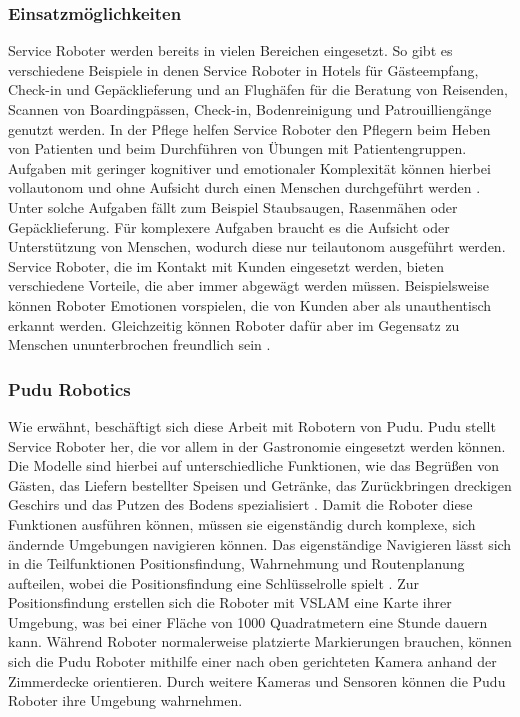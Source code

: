 \subsubsection{Einsatzmöglichkeiten}
Service Roboter werden bereits in vielen Bereichen eingesetzt. So gibt es verschiedene Beispiele in denen Service Roboter in Hotels für Gästeempfang, Check-in und Gepäcklieferung und an Flughäfen für die Beratung von Reisenden, Scannen von Boardingpässen, Check-in, Bodenreinigung und Patrouilliengänge genutzt werden. In der Pflege helfen Service Roboter den Pflegern beim Heben von Patienten und beim Durchführen von Übungen mit Patientengruppen.\cite[S.~425-427]{Paluch2020} Aufgaben mit geringer kognitiver und emotionaler Komplexität können hierbei vollautonom und ohne Aufsicht durch einen Menschen durchgeführt werden \cite[S.~429]{Paluch2020}. Unter solche Aufgaben fällt zum Beispiel Staubsaugen, Rasenmähen oder Gepäcklieferung. Für komplexere Aufgaben braucht es die Aufsicht oder Unterstützung von Menschen, wodurch diese nur teilautonom ausgeführt werden. Service Roboter, die im Kontakt mit Kunden eingesetzt werden, bieten verschiedene Vorteile, die aber immer abgewägt werden müssen. Beispielsweise können Roboter Emotionen vorspielen, die von Kunden aber als unauthentisch erkannt werden. Gleichzeitig können Roboter dafür aber im Gegensatz zu Menschen ununterbrochen freundlich sein \cite[S.~427]{Paluch2020}. 

\subsubsection{Pudu Robotics}
Wie erwähnt, beschäftigt sich diese Arbeit mit Robotern von Pudu. Pudu stellt Service Roboter her, die vor allem in der Gastronomie eingesetzt werden können. Die Modelle sind hierbei auf unterschiedliche Funktionen, wie das Begrüßen von Gästen, das Liefern bestellter Speisen und Getränke, das Zurückbringen dreckigen Geschirs und das Putzen des Bodens spezialisiert \cite{PUDU2024}. Damit die Roboter diese Funktionen ausführen können, müssen sie eigenständig durch komplexe, sich ändernde Umgebungen navigieren können. Das eigenständige Navigieren lässt sich in die Teilfunktionen Positionsfindung, Wahrnehmung und Routenplanung aufteilen, wobei die Positionsfindung eine Schlüsselrolle spielt \cite{Nature2022}. Zur Positionsfindung erstellen sich die Roboter mit \ac{VSLAM} eine Karte ihrer Umgebung, was bei einer Fläche von 1000 Quadratmetern eine Stunde dauern kann. Während Roboter normalerweise platzierte Markierungen brauchen, können sich die Pudu Roboter mithilfe einer nach oben gerichteten Kamera anhand der Zimmerdecke orientieren.\cite{Pudu2023} Durch weitere Kameras und Sensoren können die Pudu Roboter ihre Umgebung wahrnehmen\cite{Nature2022}.

